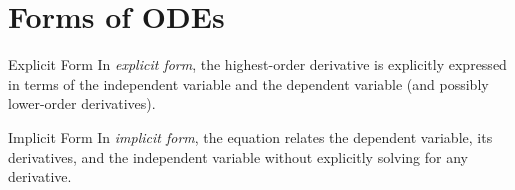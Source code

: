 \section{Forms of ODEs}

\begin{definition}{Explicit Form}{}
  In \emph{explicit form},
  the highest-order derivative is explicitly expressed in terms of the independent variable
  and the dependent variable (and possibly lower-order derivatives).
\end{definition}

\begin{definition}{Implicit Form}{}
  In \emph{implicit form},
  the equation relates the dependent variable, its derivatives, and the independent variable
  without explicitly solving for any derivative.
\end{definition}







